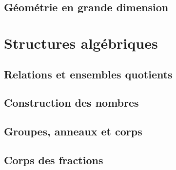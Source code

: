 \documentclass[a4paper,11pt]{book}
\begin{document}
\chapter{Géométrie en grande dimension}


\clearpage

\part{Structures algébriques}

\chapter{Relations et ensembles quotients}


\clearpage

\chapter{Construction des nombres}


\clearpage


\clearpage


\clearpage


\clearpage


\clearpage


\clearpage

\chapter{Groupes, anneaux et corps}


\clearpage


\clearpage


\clearpage


\clearpage

\chapter{Corps des fractions}
\end{document}
